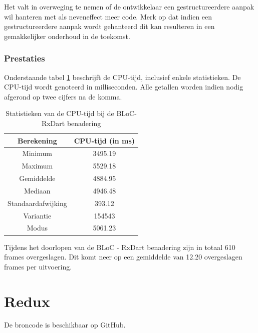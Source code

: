 Het valt in overweging te nemen of de ontwikkelaar een gestructureerdere aanpak wil hanteren met als neveneffect meer code. Merk op dat indien een gestructureerdere aanpak wordt gehanteerd dit kan resulteren in een gemakkelijker onderhoud in de toekomst. 
\subsubsection{Prestaties}
Onderstaande tabel \ref{table:experiment-bloc-rxdart-statistics} beschrijft de CPU-tijd, inclusief enkele statistieken. De CPU-tijd wordt genoteerd in milliseconden. Alle getallen worden indien nodig afgerond op twee cijfers na de komma.
\begin{table}[H]
    \centering
    \begin{tabular}{c|c}
        \textbf{Berekening} & \textbf{CPU-tijd (in ms)}  \\ \hline
        Minimum             & 3495.19                    \\ \hline
        Maximum             & 5529.18                    \\ \hline
        Gemiddelde          & 4884.95                    \\ \hline
        Mediaan             & 4946.48                    \\ \hline
        Standaardafwijking  & 393.12                     \\ \hline
        Variantie           & 154543                     \\ \hline
        Modus               & 5061.23                      \\                
    \end{tabular}
    \caption{Statistieken van de CPU-tijd bij de BLoC-RxDart benadering}
    \label{table:experiment-bloc-rxdart-statistics}
\end{table}

Tijdens het doorlopen van de BLoC - RxDart benadering zijn in totaal 610 frames overgeslagen. Dit komt neer op een gemiddelde van 12.20 overgeslagen frames per uitvoering.

\section{Redux}
De broncode is beschikbaar op GitHub. \autocite{DeVrient2019d}
